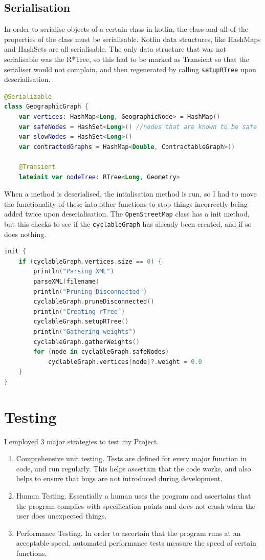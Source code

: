 \documentclass[11pt,twoside,a4paper]{report}
\begin{document}
\section{Serialisation}
In order to serialise objects of a certain class in kotlin, the class and all of the properties of the class must be serialisable. Kotlin data structures, like HashMaps and HashSets are all serialisable.
The only data structure that was not serialisable was the R*Tree, so this had to be marked as Transient so that the serialiser would not complain, and then regenerated by calling \texttt{setupRTree} upon deserialisation.
\begin{lstlisting}[language=kotlin]
@Serializable
class GeographicGraph {
    var vertices: HashMap<Long, GeographicNode> = HashMap()
    var safeNodes = HashSet<Long>() //nodes that are known to be safe
    var slowNodes = HashSet<Long>()
    var contractedGraphs = HashMap<Double, ContractableGraph>()

    @Transient
    lateinit var nodeTree: RTree<Long, Geometry>
\end{lstlisting}
When a method is deserialised, the intialisation method is run, so I had to move the functionality of these into other functions to stop things incorrectly being added twice upon deserialisation.
The \texttt{OpenStreetMap} class has a init method, but this checks to see if the \texttt{cyclableGraph} has already been created, and if so does nothing.
\begin{lstlisting}[language=kotlin]
init {
    if (cyclableGraph.vertices.size == 0) {
        println("Parsing XML")
        parseXML(filename)
        println("Pruning Disconnected")
        cyclableGraph.pruneDisconnected()
        println("Creating rTree")
        cyclableGraph.setupRTree()
        println("Gathering weights")
        cyclableGraph.gatherWeights()
        for (node in cyclableGraph.safeNodes)
            cyclableGraph.vertices[node]?.weight = 0.0
    }
}
\end{lstlisting}
\newpage
\chapter{Testing}
I employed 3 major strategies to test my Project.
\begin{enumerate}
    \item Comprehensive unit testing. Tests are defined for every major function in code, and run regularly. This helps ascertain that the code works, and also helps to ensure that bugs are not introduced during development.
    \item Human Testing. Essentially a human uses the program and ascertains that the program complies with specification points and does not crash when the user does unexpected things.
    \item Performance Testing. In order to ascertain that the program runs at an acceptable speed, automated performance tests measure the speed of certain functions.
\end{enumerate}
\end{document}
